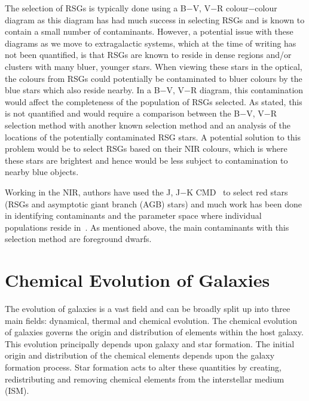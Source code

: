 The selection of RSGs is typically done using a B$-$V, V$-$R colour$-$colour diagram as this diagram has had much success in selecting RSGs and is known to contain a small number of contaminants.
However, a potential issue with these diagrams as we move to extragalactic systems, which at the time of writing has not been quantified, is that RSGs are known to reside in dense regions and/or clusters with many bluer, younger stars.
When viewing these stars in the optical, the colours from RSGs could potentially be contaminated to bluer colours by the blue stars which also reside nearby.
In a B$-$V, V$-$R diagram, this contamination would affect the completeness of the population of RSGs selected.
As stated, this is not quantified and would require a comparison between the B$-$V, V$-$R selection method with another known selection method and an analysis of the locations of the potentially contaminated RSG stars.
A potential solution to this problem would be to select RSGs based on their NIR colours, which is where these stars are brightest and hence would be less subject to contamination to nearby blue objects.

Working in the NIR, authors have used the J, J$-$K CMD~\citep{2000ApJ...542..804N,2006A&A...452..195C,Neugent12} to select red stars (RSGs and asymptotic giant branch (AGB) stars) and much work has been done in identifying contaminants and the parameter space where individual populations reside in~\citep{2006A&A...452..195C}.
As mentioned above, the main contaminants with this selection method are foreground dwarfs.



\section{Chemical Evolution of Galaxies} %
\label{sec:chemical_evolution_of_galaxies}

The evolution of galaxies is a vast field and can be broadly split up into three main fields: dynamical, thermal and chemical evolution.
The chemical evolution of galaxies governs the origin and distribution of elements within the host galaxy.
This evolution principally depends upon galaxy and star formation.
The initial origin and distribution of the chemical elements depends upon the galaxy formation process.
Star formation acts to alter these quantities by creating, redistributing and removing chemical elements from the interstellar medium (ISM).


